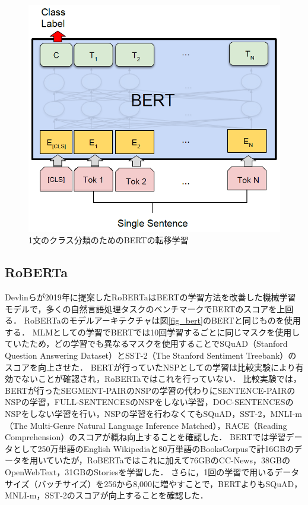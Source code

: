\documentclass[12pt,a4j,dvipdfmx]{jreport}
\begin{document}
\begin{figure}[H]
	\centering
	\includegraphics[keepaspectratio, width=120mm]{img/single-sentence-classification-of-bert.png}
	\caption{1文のクラス分類のためのBERTの転移学習\protect\footnotemark[6]}
	\label{fig_single_sentence_classification_of_bert}
\end{figure}




\subsection{RoBERTa}
Devlinらが2019年に提案したRoBERTaはBERTの学習方法を改善した機械学習モデルで，多くの自然言語処理タスクのベンチマークでBERTのスコアを上回る．
RoBERTaのモデルアーキテクチャは図\ref{fig_bert}のBERTと同じものを使用する．
MLMとしての学習でBERTでは10回学習するごとに同じマスクを使用していたため，どの学習でも異なるマスクを使用することでSQuAD（Stanford Question Answering Dataset）とSST-2（The Stanford Sentiment Treebank）のスコアを向上させた．
BERTが行っていたNSPとしての学習は比較実験により有効でないことが確認され，RoBERTaではこれを行っていない．
比較実験では，BERTが行ったSEGMENT-PAIRのNSPの学習の代わりにSENTENCE-PAIRのNSPの学習，FULL-SENTENCESのNSPをしない学習，DOC-SENTENCESのNSPをしない学習を行い，NSPの学習を行わなくてもSQuAD，SST-2，MNLI-m（The Multi-Genre Natural Language Inference Matched），RACE（Reading Comprehension）のスコアが概ね向上することを確認した．
BERTでは学習データとして250万単語のEnglish Wikipediaと80万単語のBooksCorpusで計16GBのデータを用いていたが，RoBERTaではこれに加えて76GBのCC-News，38GBのOpenWebText，31GBのStoriesを学習した．
さらに，1回の学習で用いるデータサイズ（バッチサイズ）を256から8,000に増やすことで，BERTよりもSQuAD，MNLI-m，SST-2のスコアが向上することを確認した．
\end{document}
